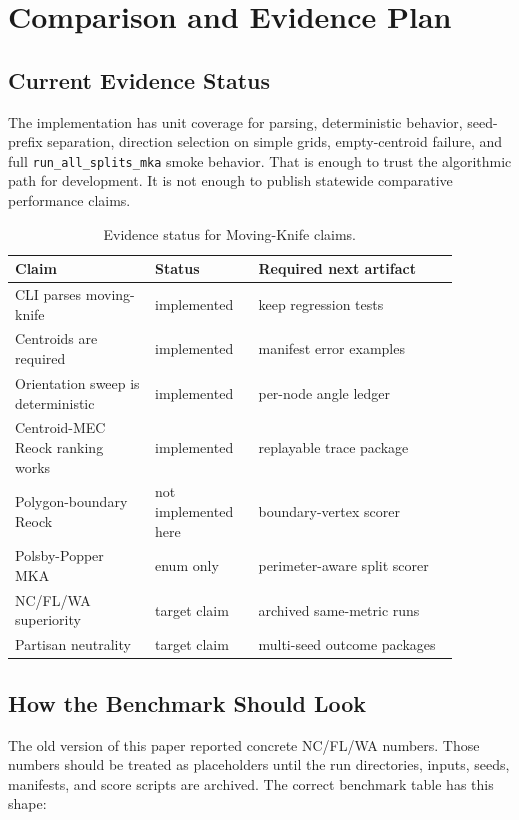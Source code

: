 \section{Comparison and Evidence Plan}
\label{sec:comparison}

\subsection{Current Evidence Status}

The implementation has unit coverage for parsing, deterministic behavior,
seed-prefix separation, direction selection on simple grids, empty-centroid
failure, and full \texttt{run\_all\_splits\_mka} smoke behavior. That is enough
to trust the algorithmic path for development. It is not enough to publish
statewide comparative performance claims.

\begin{table}[t]
\centering
\small
\caption{Evidence status for Moving-Knife claims.}
\label{tab:evidence-status}
\renewcommand{\arraystretch}{1.25}
\begin{tabular}{@{}p{0.28\linewidth}p{0.20\linewidth}p{0.40\linewidth}@{}}
\toprule
Claim & Status & Required next artifact \\
\midrule
CLI parses moving-knife & implemented & keep regression tests \\
Centroids are required & implemented & manifest error examples \\
Orientation sweep is deterministic & implemented & per-node angle ledger \\
Centroid-MEC Reock ranking works & implemented & replayable trace package \\
Polygon-boundary Reock & not implemented here & boundary-vertex scorer \\
Polsby-Popper MKA & enum only & perimeter-aware split scorer \\
NC/FL/WA superiority & target claim & archived same-metric runs \\
Partisan neutrality & target claim & multi-seed outcome packages \\
\bottomrule
\end{tabular}
\end{table}

\subsection{How the Benchmark Should Look}

The old version of this paper reported concrete NC/FL/WA numbers. Those
numbers should be treated as placeholders until the run directories, inputs,
seeds, manifests, and score scripts are archived. The correct benchmark table
has this shape:

